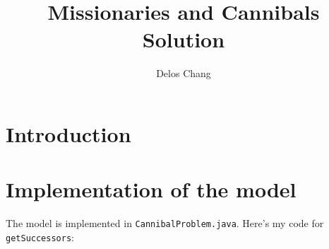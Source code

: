 \documentclass[a4paper]{report}
\title{Missionaries and Cannibals Solution}
\author{Delos Chang}
\begin{document}
\maketitle

\section{Introduction}

\section{Implementation of the model}

The model is implemented in 
\verb`CannibalProblem.java`.  Here's my code for \verb`getSuccessors`:

\end{document}
